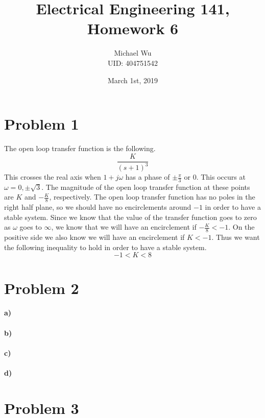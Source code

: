\documentclass[12pt]{article}
\begin{document}
\title{Electrical Engineering 141, Homework 6}
\date{March 1st, 2019}
\author{Michael Wu\\UID: 404751542}
\maketitle

\section*{Problem 1}

The open loop transfer function is the following.
\[\frac{K}{(s+1)^3}\]
This crosses the real axis when \(1+j\omega\) has a phase of \(\pm \frac{\pi}{3}\) or \(0\). This occurs
at \(\omega=0,\pm\sqrt{3}\). The magnitude of the open loop transfer function at these points are
\(K\) and \(-\frac{K}{8}\), respectively. The open loop transfer function has no poles in the right half
plane, so we should have no encirclements around \(-1\) in order to have a stable system. Since we know
that the value of the transfer function goes to zero as \(\omega\) goes to \(\infty\), we know that we
will have an encirclement if \(-\frac{K}{8}<-1\). On the positive side we also know we will have an
encirclement if \(K<-1\). Thus we want the following inequality to hold in order to have a stable system.
\[-1<K<8\]

\section*{Problem 2}

\paragraph{a)}

\paragraph{b)}

\paragraph{c)}

\paragraph{d)}

\section*{Problem 3}
\end{document}
